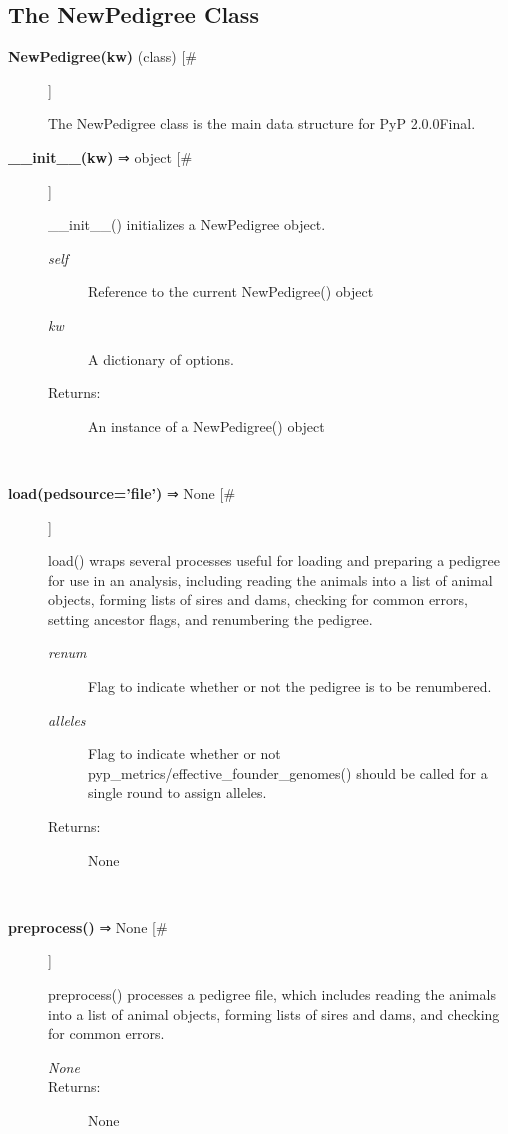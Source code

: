 \documentclass[10pt]{article}
\begin{document}
\subsection*{The NewPedigree Class}
\begin{description}
\item[\textbf{NewPedigree(kw)}
 (class) [\#]]

 The NewPedigree class is the main data structure for PyP 2.0.0Final.

\item[\textbf{\_\_init\_\_(kw)}
 ⇒ object [\#]]

 \_\_init\_\_() initializes a NewPedigree object.
\begin{description}
\item[\emph{self}
] Reference to the current NewPedigree() object
\item[\emph{kw}
] A dictionary of options.
\item[Returns:] An instance of a NewPedigree() object

\end{description}
\\ 

\item[\textbf{load(pedsource='file')}
 ⇒ None [\#]]

 load() wraps several processes useful for loading and preparing a pedigree for use in an analysis, including reading the animals into a list of animal objects, forming lists of sires and dams, checking for common errors, setting ancestor flags, and renumbering the pedigree.
\begin{description}
\item[\emph{renum}
] Flag to indicate whether or not the pedigree is to be renumbered.
\item[\emph{alleles}
] Flag to indicate whether or not pyp\_metrics/effective\_founder\_genomes() should be called for a single round to assign alleles.
\item[Returns:] None

\end{description}
\\ 

\item[\textbf{preprocess()}
 ⇒ None [\#]]

 preprocess() processes a pedigree file, which includes reading the animals into a list of animal objects, forming lists of sires and dams, and checking for common errors.
\begin{description}
\item[\emph{None}
]
\item[Returns:] None


\end{description}
\end{description}
\end{document}
